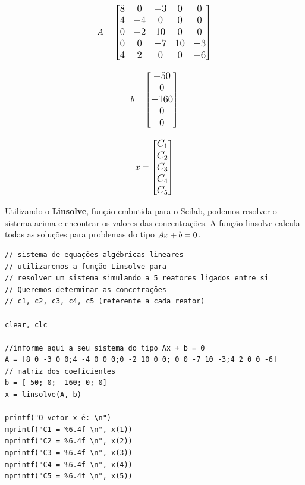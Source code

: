 $$\large A = \begin{bmatrix} 8 & 0 & -3 & 0 & 0 \\ 4 & -4 & 0 & 0 & 0 \\ 0 & -2 & 10 & 0 & 0 \\ 0 & 0 & -7 & 10 & -3 \\ 4 & 2 & 0 & 0 & -6 \end{bmatrix}$$

$$\large b = \begin{bmatrix} -50 \\ 0 \\ -160 \\ 0 \\ 0 \end{bmatrix}$$

$$\large x = \begin{bmatrix} C_{1} \\ C_{2} \\ C_{3} \\ C_{4} \\ C_{5} \end{bmatrix}$$

Utilizando o \textbf{Linsolve}, função embutida para o Scilab, podemos resolver o sistema acima e encontrar os valores das concentrações. A função linsolve calcula todas as soluções para problemas do tipo $\large Ax + b = 0$.

\begin{verbatim}
// sistema de equações algébricas lineares
// utilizaremos a função Linsolve para 
// resolver um sistema simulando a 5 reatores ligados entre si
// Queremos determinar as concetrações 
// c1, c2, c3, c4, c5 (referente a cada reator)

clear, clc

//informe aqui a seu sistema do tipo Ax + b = 0
A = [8 0 -3 0 0;4 -4 0 0 0;0 -2 10 0 0; 0 0 -7 10 -3;4 2 0 0 -6] 
// matriz dos coeficientes
b = [-50; 0; -160; 0; 0] 
x = linsolve(A, b)

printf("O vetor x é: \n")
mprintf("C1 = %6.4f \n", x(1))
mprintf("C2 = %6.4f \n", x(2))
mprintf("C3 = %6.4f \n", x(3))
mprintf("C4 = %6.4f \n", x(4))
mprintf("C5 = %6.4f \n", x(5))
\end{verbatim}